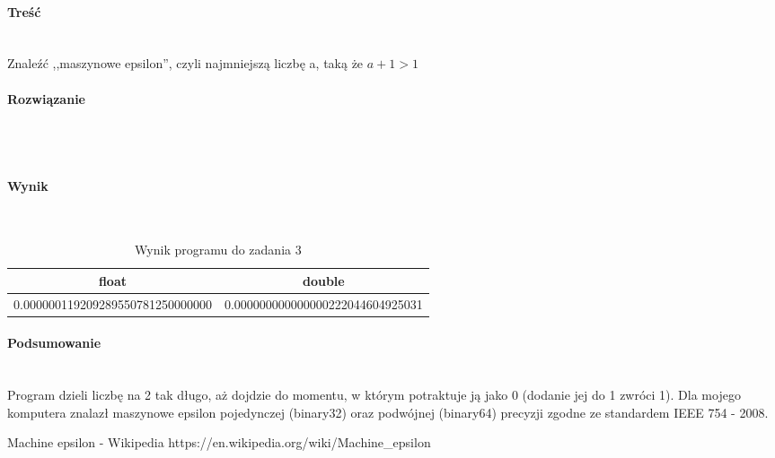 \paragraph{Treść} ~\\
Znaleźć ,,maszynowe epsilon'', czyli najmniejszą liczbę a, taką że $ a + 1 > 1 $ \\

\paragraph{Rozwiązanie} ~\\
 ~\\

\paragraph{Wynik} ~\\
\begin{table}[h]
  \centering
  \begin{tabular}{c|c}
    float & double \\
    \hline 0.000000119209289550781250000000 & 0.000000000000000222044604925031 \\
  \end{tabular}
  \caption{Wynik programu do zadania 3}
  \label{tab:WynikProgramuDoZadania3}
\end{table}

\paragraph{Podsumowanie} ~\\
Program dzieli liczbę na 2 tak długo, aż dojdzie do momentu, w którym potraktuje ją jako 0 (dodanie jej do 1 zwróci 1).
Dla mojego komputera znalazł maszynowe epsilon pojedynczej (binary32) oraz podwójnej (binary64) precyzji zgodne ze standardem IEEE 754 - 2008\nocite{WikiMachineEpsilon}.

\begin{thebibliography}{9}
   Machine epsilon - Wikipedia https://en.wikipedia.org/wiki/Machine\_epsilon
\end{thebibliography}
